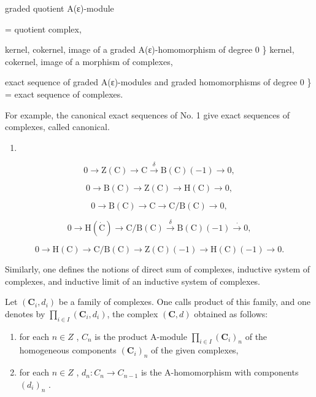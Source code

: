 graded quotient A(ε)-module

= quotient complex,

kernel, cokernel, image of a graded A(ε)-homomorphism of degree 0 \} kernel, cokernel, image of a morphism of complexes,

exact sequence of graded A(ε)-modules and graded homomorphisms of degree 0 \} = exact sequence of complexes.

For example, the canonical exact sequences of No. 1 give exact sequences of complexes, called canonical.

\begin{enumerate}
\def\labelenumi{(\Roman{enumi})}
\tightlist
\item
\end{enumerate}

\[
0 \longrightarrow \mathrm{Z} (\mathrm{C}) \longrightarrow \mathrm{C} \stackrel {\delta} {\longrightarrow} \mathrm{B} (\mathrm{C}) (- 1) \longrightarrow 0,\tag{II}
\]

\[
0 \longrightarrow \mathrm{B} (\mathrm{C}) \longrightarrow \mathrm{Z} (\mathrm{C}) \longrightarrow \mathrm{H} (\mathrm{C}) \longrightarrow 0,\tag{III}
\]

\[
0 \longrightarrow \mathrm{B} (\mathrm{C}) \longrightarrow \mathrm{C} \longrightarrow \mathrm{C} / \mathrm{B} (\mathrm{C}) \longrightarrow 0,\tag{IV}
\]

\[
0 \longrightarrow \mathrm{H} (\dot {\mathrm{C}}) \longrightarrow \mathrm{C} / \mathrm{B} (\mathrm{C}) \stackrel {\delta} {\longrightarrow} \mathrm{B} (\mathrm{C}) (- 1) \stackrel {\cdot} {\longrightarrow} 0,\tag{V}
\]

\[
0 \longrightarrow \mathrm{H} (\mathrm{C}) \longrightarrow \mathrm{C} / \mathrm{B} (\mathrm{C}) \longrightarrow \mathrm{Z} (\mathrm{C}) (- 1) \longrightarrow \mathrm{H} (\mathrm{C}) (- 1) \longrightarrow 0.
\]

Similarly, one defines the notions of direct sum of complexes, inductive system of complexes, and inductive limit of an inductive system of complexes.

Let \((\mathbf{C}_{i}, d_{i})\) be a family of complexes. One calls product of this family, and one denotes by \(\prod_{i \in I} (\mathbf{C}_{i}, d_{i})\), the complex \((\mathbf{C}, d)\) obtained as follows:

\begin{enumerate}
\def\labelenumi{\alph{enumi})}
\item
  for each \(n \in Z\) , \(C_{n}\) is the product A-module \(\prod_{i \in I} (\mathbf{C}_{i})_{n}\) of the homogeneous components \((\mathbf{C}_{i})_{n}\) of the given complexes,
\item
  for each \(n \in Z\) , \(d_{n} : C_{n} \to C_{n-1}\) is the A-homomorphism with components \((d_{i})_{n}\) .
\end{enumerate}

